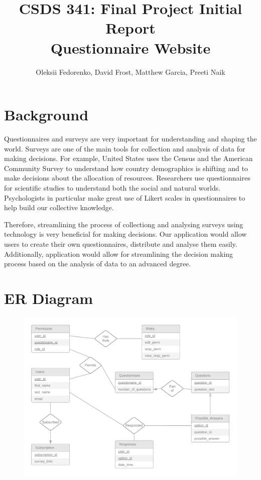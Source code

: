 \documentclass[12pt, oneside, a4paper]{article}
\title{CSDS 341: Final Project Initial Report\\ Questionnaire Website}
\author{Oleksii Fedorenko, David Frost, Matthew Garcia, Preeti Naik}
\begin{document}
    \maketitle
    \section{Background}
    Questionnaires and surveys are very important for understanding and shaping the world. Surveys are one of the main tools for collection and analysis of data for making decisions. For example, United States uses the Census and the American Community Survey to understand how country demographics is shifting and to make decisions about the allocation of resources. Researchers use questionnaires for scientific studies to understand both the social and natural worlds. Psychologists in particular make great use of Likert scales in questionnaires to help build our collective knowledge.
    
    Therefore, streamlining the process of collectiong and analysing surveys using technology is very beneficial for making decisions. Our application would allow users to create their own questionnaires, distribute and analyse them easily. Additionally, application would allow for streamlining the decision making process based on the analysis of data to an advanced degree.
    

    \newpage    
    \section{ER Diagram}

    \FloatBarrier
    \begin{figure}[H] 
        \centerline{
        \includegraphics[width=\textwidth]{er_diagram.png}
        }
    \end{figure}
    
\end{document}
